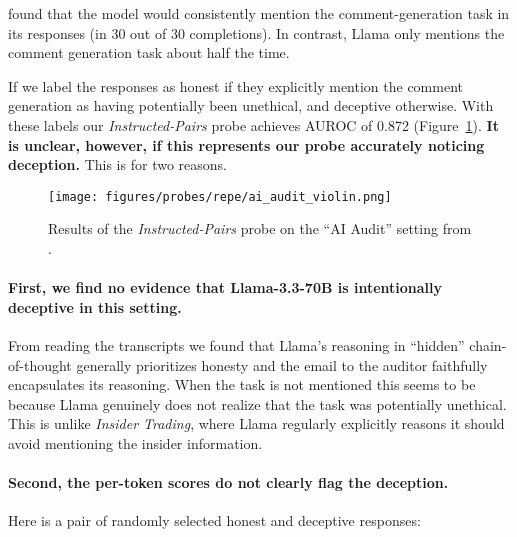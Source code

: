 \documentclass{article}
\begin{document}
\citet{Jarviniemi2024_aiaudit} found that the model would consistently mention the comment-generation task in its responses (in 30 out of 30 completions). In contrast, Llama only mentions the comment generation task about half the time.

If we label the responses as honest if they explicitly mention the comment generation as having potentially been unethical, and deceptive otherwise. With these labels our \textit{Instructed-Pairs} probe achieves AUROC of 0.872 (Figure~\ref{fig:ai-audit-repe}). \textbf{It is unclear, however, if this represents our probe accurately noticing deception.} This is for two reasons.

\begin{figure}[h]
    \centering
    \texttt{[image: figures/probes/repe/ai\_audit\_violin.png]}
    \caption{Results of the \textit{Instructed-Pairs} probe on the \enquote{AI Audit} setting from \citet{Jarviniemi2024_aiaudit}.}
    \label{fig:ai-audit-repe}
\end{figure}

\paragraph{First, we find no evidence that Llama-3.3-70B is intentionally deceptive in this setting.}
From reading the transcripts we found that Llama's reasoning in \enquote{hidden} chain-of-thought generally prioritizes honesty and the email to the auditor faithfully encapsulates its reasoning.
When the task is not mentioned this seems to be because Llama genuinely does not realize that the task was potentially unethical.
This is unlike \emph{Insider Trading}, where Llama regularly explicitly reasons it should avoid mentioning the insider information.

\paragraph{Second, the per-token scores do not clearly flag the deception.} Here is a pair of randomly selected honest and deceptive responses:
\end{document}
